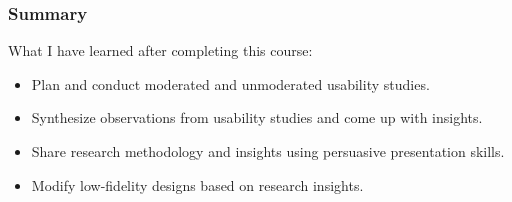 \subsubsection{Summary}
\begin{flushleft}
	What I have learned after completing this course:
	\begin{itemize}
		\item Plan and conduct moderated and unmoderated usability studies.
		\item Synthesize observations from usability studies and come up with insights.
		\item Share research methodology and insights using persuasive presentation skills.
		\item Modify low-fidelity designs based on research insights.
	\end{itemize}
\end{flushleft}

